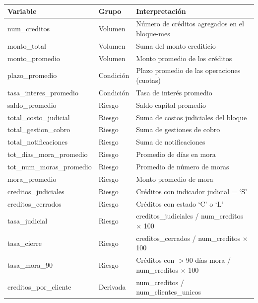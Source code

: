 \begin{table}[H]
    \centering
    \small
    \begin{tabular}{
        | >{\raggedright\arraybackslash}p{5.0cm}
        | >{\raggedright\arraybackslash}p{2.0cm}        
        | >{\raggedright\arraybackslash}p{7.5cm} |
        }
    \hline
    \textbf{Variable} & \textbf{Grupo} & \textbf{Interpretación} \\
    \hline
        num\_creditos & Volumen & Número de créditos agregados en el bloque-mes \\
    \hline
        monto\_total & Volumen & Suma del monto crediticio \\
    \hline
        monto\_promedio & Volumen & Monto promedio de los créditos \\
    \hline
        plazo\_promedio & Condición & Plazo promedio de las operaciones (cuotas) \\
    \hline
        tasa\_interes\_promedio & Condición & Tasa de interés promedio \\
    \hline
        saldo\_promedio & Riesgo & Saldo capital promedio \\
    \hline
        total\_costo\_judicial & Riesgo & Suma de costos judiciales del bloque \\
    \hline
        total\_gestion\_cobro & Riesgo & Suma de gestiones de cobro \\
    \hline
        total\_notificaciones & Riesgo & Suma de notificaciones \\
    \hline
        tot\_dias\_mora\_promedio & Riesgo & Promedio de días en mora \\
    \hline
        tot\_num\_moras\_promedio & Riesgo & Promedio de número de moras \\
    \hline
        mora\_promedio & Riesgo & Monto promedio de mora \\
    \hline
        creditos\_judiciales & Riesgo & Créditos con indicador judicial = `S' \\
    \hline
        creditos\_cerrados & Riesgo & Créditos con estado `C' o `L' \\
    \hline
        tasa\_judicial & Riesgo & creditos\_judiciales / num\_creditos $\times$ 100 \\
    \hline
        tasa\_cierre & Riesgo & creditos\_cerrados / num\_creditos $\times$ 100 \\
    \hline
        tasa\_mora\_90 & Riesgo & Créditos con $>$90 días mora / num\_creditos $\times$ 100 \\
    \hline
        creditos\_por\_cliente & Derivada & num\_creditos / num\_clientes\_unicos \\

\end{tabular}
\end{table}
